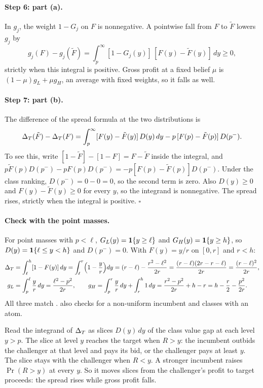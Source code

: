 \paragraph{Step 6: part (a).} In \(g_j\), the weight \(1-G_j\) on \(F\) is nonnegative. A pointwise fall from
\(F\) to \(\tilde F\) lowers \(g_j\) by
\[
g_j(F)-g_j(\tilde F)=\int_p^\infty[1-G_j(y)]\,[F(y)-\tilde F(y)]\,dy\ge0,
\]
strictly when this integral is positive. Gross profit at a fixed belief \(\mu\) is \((1-\mu)g_L+\mu g_H\),
an average with fixed weights, so it falls as well.

\paragraph{Step 7: part (b).} The difference of the spread formula at the two distributions is
\[
\Delta_T(\tilde F)-\Delta_T(F)=\int_p^\infty[F(y)-\tilde F(y)]\,D(y)\,dy-p\,[F(p)-\tilde F(p)]\,D(p^-).
\]
To see this, write \([1-\tilde F]-[1-F]=F-\tilde F\) inside the integral, and
\(p\tilde F(p)D(p^-)-pF(p)D(p^-)=-p[F(p)-\tilde F(p)]D(p^-)\). Under the class ranking, \(D(p^-)=0-0=0\),
so the second term is zero. Also \(D(y)\ge0\) and \(F(y)-\tilde F(y)\ge0\) for every \(y\), so the
integrand is nonnegative. The spread rises, strictly when the integral is positive. \hfill\(\square\)

\paragraph{Check with the point masses.} For point masses with \(p<\ell\), \(G_L(y)=\mathbf{1}\{y\ge\ell\}\) and
\(G_H(y)=\mathbf{1}\{y\ge h\}\), so \(D(y)=\mathbf{1}\{\ell\le y<h\}\) and \(D(p^-)=0\). With \(F(y)=y/r\) on \([0,r]\)
and \(r<h\):
\begin{align*}
\Delta_T&=\int_\ell^h[1-F(y)]\,dy=\int_\ell^r\Bigl(1-\frac yr\Bigr)dy=(r-\ell)-\frac{r^2-\ell^2}{2r}
=\frac{(r-\ell)(2r-r-\ell)}{2r}=\frac{(r-\ell)^2}{2r},\\
g_L&=\int_p^\ell\frac yr\,dy=\frac{\ell^2-p^2}{2r},\qquad
g_H=\int_p^r\frac yr\,dy+\int_r^h1\,dy=\frac{r^2-p^2}{2r}+h-r=h-\frac r2-\frac{p^2}{2r}.
\end{align*}
All three match .  also checks  for a non-uniform
incumbent and classes with an atom.

\begin{intuition}
Read the integrand of \(\Delta_T\) as slices \(D(y)\,dy\) of the class value gap at each level \(y>p\). The
slice at level \(y\) reaches the target when \(R>y\): the incumbent outbids the challenger at that level
and pays its bid, or the challenger pays at least \(y\). The slice stays with the challenger when \(R<y\).
A stronger incumbent raises \(\Pr(R>y)\) at every \(y\). So it moves slices from the challenger's profit
to target proceeds: the spread rises while gross profit falls.
\end{intuition}

